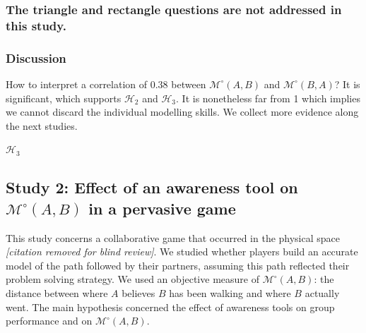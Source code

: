 \documentclass[natbib]{svjour3}
\newcommand{\gModel}[2]{{$\mathcal{M}^{\circ}(#1, #2)$}}
\begin{document}
\subsubsection*{The triangle and rectangle questions are not addressed in this study.}

\subsubsection*{Discussion}

How to interpret a correlation of 0.38 between \gModel{A}{B} and \gModel{B}{A}?
It is significant, which supports $\mathcal{H}_{2}$ and $\mathcal{H}_{3}$. It is
nonetheless far from 1 which implies we cannot discard the individual modelling
skills. We collect more evidence along the next studies.

$\mathcal{H}_{3}$



\subsection{{\bf Study 2}: Effect of an awareness tool on \gModel{A}{B}  in a pervasive
game}

This study concerns a collaborative game that occurred in the physical
space \textit{[citation removed for blind review]}. We studied whether players
build an accurate model of the path followed by their partners, assuming this
path reflected their problem solving strategy. We used an objective measure of
\gModel{A}{B}: the distance between where $A$ believes $B$ has been walking and
where $B$ actually went.  The main hypothesis concerned the effect of awareness
tools on group performance and on \gModel{A}{B}. 
\end{document}
